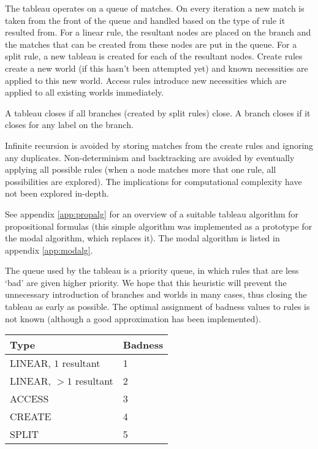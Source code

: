 The tableau operates on a queue of matches. On every iteration a new match is
taken from the front of the queue and handled based on the type of rule it
resulted from. For a linear rule, the resultant nodes are placed on the branch
and the matches that can be created from these nodes are put in the queue. For
a split rule, a new tableau is created for each of the resultant nodes. Create
rules create a new world (if this hasn't been attempted yet) and known
necessities are applied to this new world. Access rules introduce new
necessities which are applied to all existing worlds immediately.

A tableau closes if all branches (created by split rules) close. A branch
closes if it closes for any label on the branch.

Infinite recursion is avoided by storing matches from the create rules and
ignoring any duplicates. Non-determinism and backtracking are avoided by
eventually applying all possible rules (when a node matches more that one
rule, all possibilities are explored). The implications for computational
complexity have not been explored in-depth.

See appendix \ref{app:propalg} for an overview of a suitable tableau algorithm
for propositional formulas (this simple algorithm was implemented as a
prototype for the modal algorithm, which replaces it). The modal algorithm is
listed in appendix \ref{app:modalg}.

The queue used by the tableau is a priority queue, in which rules that are
less `bad' are given higher priority. We hope that this heuristic will prevent
the unnecessary introduction of branches and worlds in many cases, thus
closing the tableau as early as possible. The optimal assignment of badness
values to rules is not known (although a good approximation has been
implemented).

\begin{tabular}{ll}
Type & Badness \\
\hline
LINEAR, $1$ resultant & 1 \\
LINEAR, $> 1$ resultant  & 2 \\
ACCESS & 3 \\
CREATE & 4 \\
SPLIT & 5 \\
\end{tabular}
